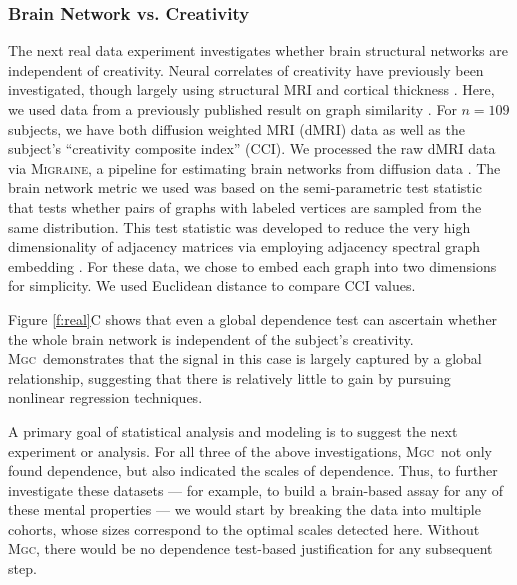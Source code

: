 \documentclass[11pt]{article}
\newcommand{\note}[2][]{\added[#1,remark={#2}]{}}
\providecommand{\sct}[1]{{\normalfont\textsc{#1}}}
\newcommand{\Migraine}{\sct{Migraine}}
\newcommand{\Mgc}{\sct{Mgc}}
\newcommand{\jv}[1]{{\note{jv: #1}}}
\begin{document}
\subsubsection*{Brain Network vs. Creativity}

The next real data experiment investigates whether brain structural networks are independent of creativity.  Neural correlates of creativity have previously been investigated, though largely using structural MRI and cortical thickness \cite{Jung2009}.  Here, we used data from a previously published result on graph similarity \cite{Koutra15a}. For  $n=109$ subjects, we have both diffusion weighted MRI (dMRI) data as well as the subject's ``creativity composite index'' (CCI).  We processed the raw dMRI data via \Migraine, a pipeline for estimating brain networks from diffusion data \cite{GrayRoncal2013}.   
The brain network metric we used was based on  the semi-parametric test statistic \cite{Tang2016} that tests whether pairs of graphs with labeled vertices are sampled from the same distribution.  This test statistic was developed to reduce  the very high dimensionality of adjacency matrices via employing adjacency spectral graph embedding  \cite{Sussman2013}. For these data, we chose to embed each graph into two dimensions for simplicity. We used Euclidean distance to compare CCI values. 


\jv{highlight that we are the only obvious way to determine that the relationship is linear for high dimensional data (otherwise, one needs to compute the linear regression with inverting the covariance matrix which is poorly sacled in high dimensions?}
Figure \ref{f:real}{\color{magenta}C} shows that even a global dependence test can ascertain whether the whole brain network is independent of the subject's creativity.  \Mgc~demonstrates that the signal in this case is largely captured by a global relationship, suggesting that there is relatively little to gain by pursuing nonlinear regression techniques. 



A primary goal of statistical analysis and modeling is to suggest the next experiment or analysis.  For all three of the above investigations, \Mgc~not only found dependence, but also indicated the scales of dependence.  
Thus, to further investigate these datasets --- for example, to build a brain-based assay for any of these mental properties --- we would start by breaking the data into multiple cohorts, whose sizes correspond to the optimal scales detected here.  Without \Mgc, there would be no dependence test-based justification for any subsequent step.
%
%
%
\end{document}
